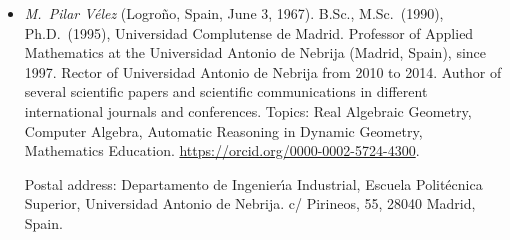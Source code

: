 \documentclass{article}
\begin{document}
\begin{itemize}
\item
\textit{M.~Pilar V\'elez} (Logro\~no, Spain, June 3, 1967).  B.Sc., M.Sc.~(1990),
Ph.D.~(1995), Universidad Complutense de Madrid. Professor of Applied
Mathematics at the Universidad Antonio de Nebrija (Madrid, Spain), since
1997. Rector of Universidad Antonio de Nebrija from 2010 to 2014. 
Author of several scientific papers and scientific communications in different
international journals and conferences. Topics: Real Algebraic Geometry, Computer Algebra, 
Automatic Reasoning in Dynamic Geometry, Mathematics Education. \url{https://orcid.org/0000-0002-5724-4300}.

Postal address: Departamento de Ingenier\'{\i}a Industrial,
Escuela Polit\'ecnica Superior, Universidad Antonio de Nebrija.
c/ Pirineos, 55, 28040 Madrid, Spain.

\end{itemize}



\end{document}
